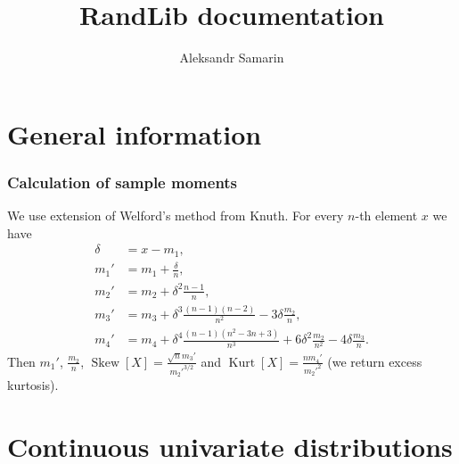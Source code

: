 \documentclass[a4paper,11pt]{article}
\title{RandLib documentation}
\author{Aleksandr Samarin}
\theoremstyle{plain}
\theoremstyle{definition}
\begin{document}
	
	\maketitle
	\tableofcontents
	
	\pagebreak
	\part{General information}
	\section{Calculation of sample moments}
	We use extension of Welford's method from Knuth. For every $n$-th element $x$ we have
	\[
	\begin{aligned}
	\delta &= x - m_1, \\
	m_1' &= m_1 +  \frac{\delta}{n}, \\
	m_2' &= m_2 +  \delta^2 \frac{n-1}{n}, \\
	m_3' &= m_3 + \delta^3 \frac{(n-1)(n-2)}{n^2} - 3\delta \frac{m_2}{n}, \\
	m_4' &= m_4 +  \delta^4 \frac{(n-1)(n^2-3n+3)}{n^3}+6\delta^2 \frac{m_2}{n^2}-4\delta\frac{m_3}{n}.
	\end{aligned}
	\]
	Then $ m_1'$, $\frac{m_2}{n}$, $\operatorname{Skew}[X] = \frac{\sqrt{n}m_3'}{m_2'^{3/2}}$ and $\operatorname{Kurt}[X] = \frac{nm_4'}{m_2'^2}$ (we return excess kurtosis).
	
	\pagebreak
	\part{Continuous univariate distributions}
\end{document}
